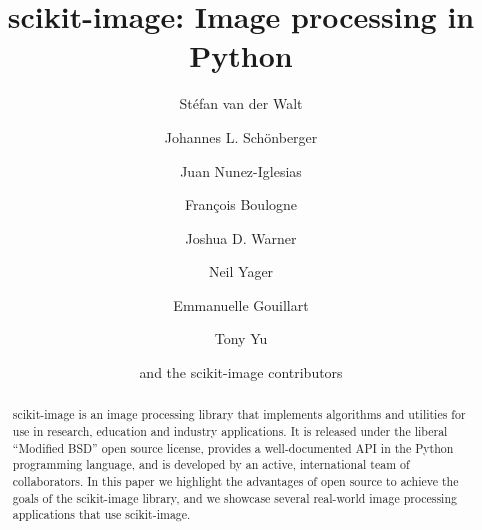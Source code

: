\documentclass[fleqn,12pt]{wlpeerj}
\begin{document}
\title{scikit-image: Image processing in Python}

\author[1,2]{Stéfan van der Walt}
\author[3]{Johannes L. Schönberger}
\author[4]{Juan Nunez-Iglesias}
\author[5]{François Boulogne}
\author[6]{Joshua D. Warner}
\author[7]{Neil Yager}
\author[8]{Emmanuelle Gouillart}
\author[9]{Tony Yu}
\author[10]{and the scikit-image contributors}



\begin{abstract}
  scikit-image is an image processing library that implements algorithms and utilities for use in research, education and industry applications. It is released under the liberal ``Modified BSD'' open source license, provides a well-documented API in the Python programming language, and is developed by an active, international team of collaborators. In this paper we highlight the advantages of open source to achieve the goals of the scikit-image library, and we showcase several real-world image processing applications that use scikit-image.
\end{abstract}

\flushbottom
\maketitle
\thispagestyle{empty}

\end{document}
